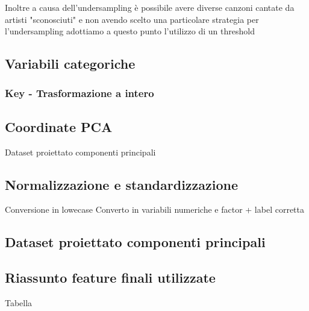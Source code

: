 Inoltre a causa dell'undersampling è possibile avere diverse canzoni cantate da artisti "sconosciuti" e non avendo scelto una particolare strategia per l'undersampling adottiamo a questo punto l'utilizzo di un threshold

\subsection{Variabili categoriche}
\subsubsection{Key - Trasformazione a intero}

\subsection{Coordinate PCA}
Dataset proiettato componenti principali

\subsection{Normalizzazione e standardizzazione}
Conversione in lowecase
Converto in variabili numeriche e factor + label corretta

\subsection{Dataset proiettato componenti principali}

\subsection{Riassunto feature finali utilizzate}
Tabella
